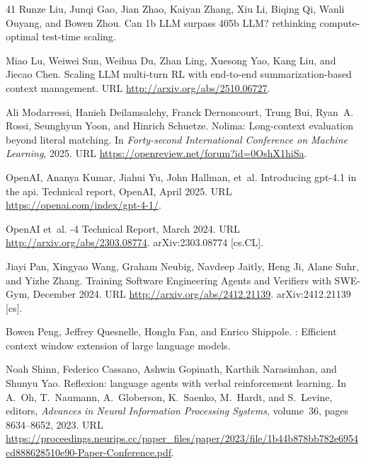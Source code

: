 \documentclass{article}
\begin{document}
\begin{thebibliography}{41}
Runze Liu, Junqi Gao, Jian Zhao, Kaiyan Zhang, Xiu Li, Biqing Qi, Wanli Ouyang, and Bowen Zhou.
\newblock Can 1b {LLM} surpass 405b {LLM}? rethinking compute-optimal test-time scaling.

Miao Lu, Weiwei Sun, Weihua Du, Zhan Ling, Xuesong Yao, Kang Liu, and Jiecao Chen.
\newblock Scaling {LLM} multi-turn {RL} with end-to-end summarization-based context management.
\newblock URL \url{http://arxiv.org/abs/2510.06727}.

Ali Modarressi, Hanieh Deilamsalehy, Franck Dernoncourt, Trung Bui, Ryan~A. Rossi, Seunghyun Yoon, and Hinrich Schuetze.
\newblock Nolima: Long-context evaluation beyond literal matching.
\newblock In \emph{Forty-second International Conference on Machine Learning}, 2025.
\newblock URL \url{https://openreview.net/forum?id=0OshX1hiSa}.

OpenAI, Ananya Kumar, Jiahui Yu, John Hallman, et~al.
\newblock Introducing gpt-4.1 in the api.
\newblock Technical report, OpenAI, April 2025.
\newblock URL \url{https://openai.com/index/gpt-4-1/}.

OpenAI et~al.
-4 {Technical} {Report}, March 2024.
\newblock URL \url{http://arxiv.org/abs/2303.08774}.
\newblock arXiv:2303.08774 [cs.CL].

Jiayi Pan, Xingyao Wang, Graham Neubig, Navdeep Jaitly, Heng Ji, Alane Suhr, and Yizhe Zhang.
\newblock Training {Software} {Engineering} {Agents} and {Verifiers} with {SWE}-{Gym}, December 2024.
\newblock URL \url{http://arxiv.org/abs/2412.21139}.
\newblock arXiv:2412.21139 [cs].

Bowen Peng, Jeffrey Quesnelle, Honglu Fan, and Enrico Shippole.
: Efficient context window extension of large language models.

Noah Shinn, Federico Cassano, Ashwin Gopinath, Karthik Narasimhan, and Shunyu Yao.
\newblock Reflexion: language agents with verbal reinforcement learning.
\newblock In A.~Oh, T.~Naumann, A.~Globerson, K.~Saenko, M.~Hardt, and S.~Levine, editors, \emph{Advances in {Neural} {Information} {Processing} {Systems}}, volume~36, pages 8634--8652, 2023.
\newblock URL \url{https://proceedings.neurips.cc/paper_files/paper/2023/file/1b44b878bb782e6954cd888628510e90-Paper-Conference.pdf}.


\end{thebibliography}
\end{document}
